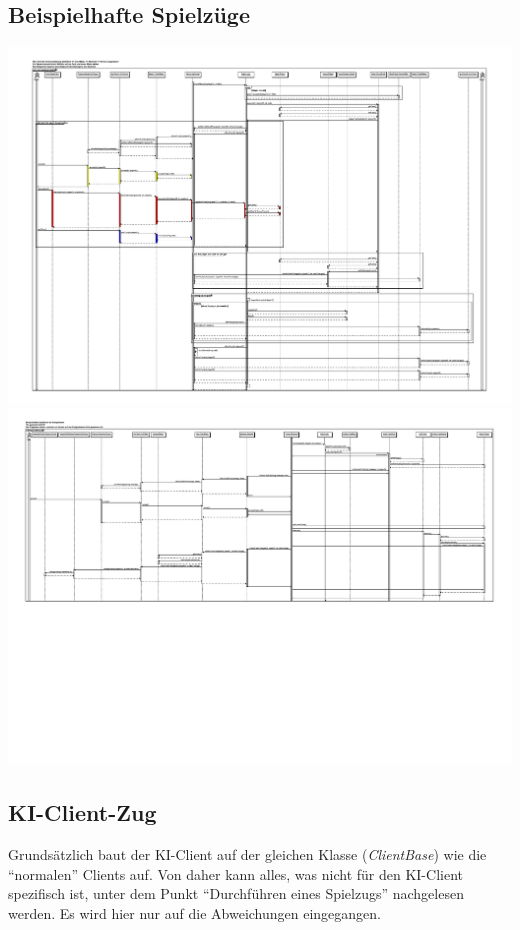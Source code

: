 \documentclass[a4paper,10pt]{article}
\begin{document}
\subsection{Beispielhafte Spielzüge}
\includegraphics[angle = 90, height=0.97\textheight]{bankrott_gehen}
\newpage
\includegraphics[angle = 90,height=0.97\textheight]{Ereigniskarte}


\subsection{KI-Client-Zug}
Grundsätzlich baut der KI-Client auf der gleichen Klasse (\textit{ClientBase}) wie die "`normalen"' Clients auf. Von daher kann alles, was nicht für den KI-Client spezifisch ist, unter dem Punkt "`Durchführen eines Spielzugs"' nachgelesen werden. Es wird hier nur auf die Abweichungen eingegangen.
\end{document}
